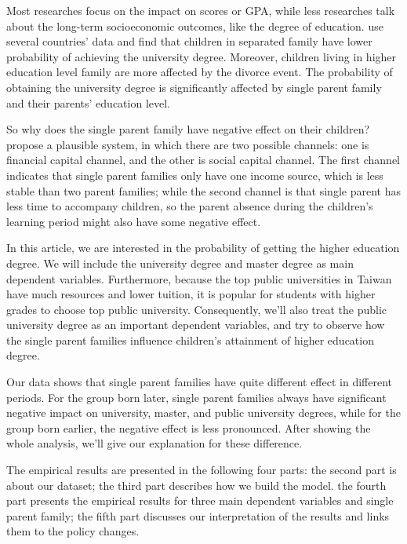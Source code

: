 \documentclass[]{AEA}
\begin{document}
    Most researches focus on the impact on scores or GPA, while less researches talk about the long-term socioeconomic outcomes, like the degree of education. \cite{bernardi2014} use several countries' data and find that children in separated family have lower probability of achieving the university degree.  Moreover, children living in higher education level family are more affected by the divorce event. The probability of obtaining the university degree is significantly affected by single parent family and their parents' education level.

    So why does the single parent family have negative effect on their children?  \cite{pong2003} propose a plausible system, in which there are two possible channels: one is financial capital channel, and the other is social capital channel. The first channel indicates that single parent families only have one income source, which is less stable than two parent families; while the second channel is that single parent has less time to accompany children, so the parent absence during the children's learning period might also have some negative effect.

    In this article, we are interested in the probability of getting the higher education degree.  We will include the university degree and master degree as main dependent variables.  Furthermore, because the top public universities in Taiwan have much resources and lower tuition, it is popular for students with higher grades to choose top public university.\citep{luoh2018} Consequently, we'll also treat the public university degree as an important dependent variables, and try to observe how the single parent families influence children's attainment of higher education degree.

    Our data shows that single parent families have quite different effect in different periods. For the group born later, single parent families always have significant negative impact on university, master, and public university degrees, while for the group born earlier, the negative effect is less pronounced.  After showing the whole analysis, we'll give our explanation for these difference.

    The empirical results are presented in the following four parts: the second part is about our dataset; the third part describes how we build the model. the fourth part presents the empirical results for three main dependent variables and single parent family; the fifth part discusses our interpretation of the results and links them to the policy changes.
    
\end{document}

